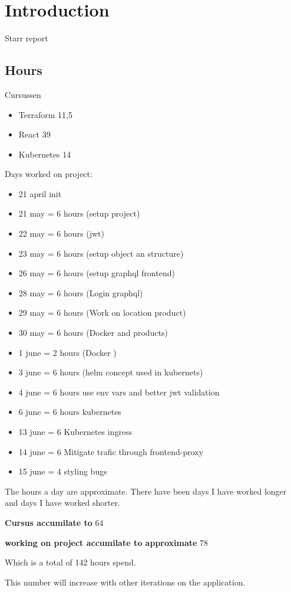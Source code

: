 \section{Introduction}
Starr report

\subsection{Hours}

Cursussen
\begin{itemize}
	\item Terraform 11,5
	\item React 39
	\item Kubernetes 14
\end{itemize}

Days worked on project:

\begin{itemize}
	\item 21 april init
	\item 21 may = 6 hours (setup project)
	\item 22 may = 6 hours (jwt)
	\item 23 may = 6 hours (setup object an structure)
	\item 26 may = 6 hours (setup graphql frontend)
	\item 28 may = 6 hours (Login graphql)
	\item 29 may = 6 hours (Work on location product)
	\item 30 may = 6 hours (Docker and products)
	\item 1 june = 2 hours (Docker )
	\item 3 june = 6 hours (helm concept used in kubernets)
	\item 4 june = 6 hours use env vars and better jwt validation
	\item 6 june = 6 hours kubernetes
	\item 13 june = 6 Kubernetes ingress
	\item 14 june = 6 Mitigate trafic through frontend-proxy
	\item 15 june = 4 styling bugs
\end{itemize}



The hours a day are approximate.
There have been days I have worked longer and days I have worked shorter.


\textbf{Cursus accumilate to}  64

\textbf{working on project accumilate to approximate} 78


Which is a total of 142 hours spend.

This number will increase with other iterations on the application.
